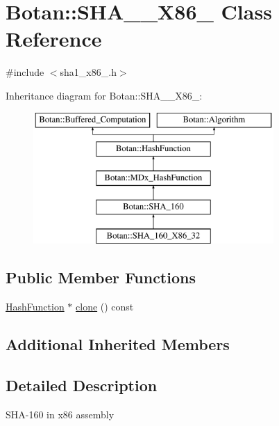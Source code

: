 \hypertarget{classBotan_1_1SHA__160__X86__32}{\section{Botan\-:\-:S\-H\-A\-\_\-\_\-\-X86\-\_ Class Reference}
\label{classBotan_1_1SHA__160__X86__32}
}


{\ttfamily \#include $<$sha1\-\_\-x86\-\_.\-h$>$}

Inheritance diagram for Botan\-:\-:S\-H\-A\-\_\-\_\-\-X86\-\_\-:\begin{figure}[H]
\begin{center}
\leavevmode
\includegraphics[height=5.000000cm]{classBotan_1_1SHA__160__X86__32}
\end{center}
\end{figure}
\subsection*{Public Member Functions}
\begin{DoxyCompactItemize}
\item 
\hyperlink{classBotan_1_1HashFunction}{Hash\-Function} $\ast$ \hyperlink{classBotan_1_1SHA__160__X86__32_ae8aa92f0b32c56c9640ff430dab217f2}{clone} () const 
\end{DoxyCompactItemize}
\subsection*{Additional Inherited Members}


\subsection{Detailed Description}
S\-H\-A-\/160 in x86 assembly 

